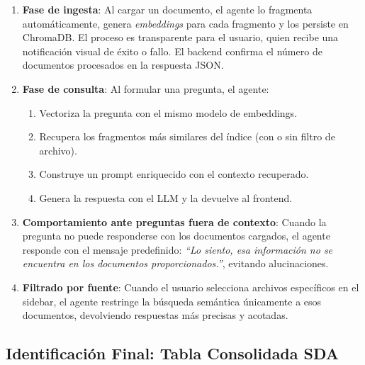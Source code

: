 \documentclass[12pt,a4paper]{article}
\begin{document}
\begin{enumerate}[leftmargin=1.5cm]
  \item \textbf{Fase de ingesta}: Al cargar un documento, el agente lo fragmenta automáticamente, genera \textit{embeddings} para cada fragmento y los persiste en ChromaDB. El proceso es transparente para el usuario, quien recibe una notificación visual de éxito o fallo. El backend confirma el número de documentos procesados en la respuesta JSON.

  \item \textbf{Fase de consulta}: Al formular una pregunta, el agente:
    \begin{enumerate}[label=\alph*.]
      \item Vectoriza la pregunta con el mismo modelo de embeddings.
      \item Recupera los fragmentos más similares del índice (con o sin filtro de archivo).
      \item Construye un prompt enriquecido con el contexto recuperado.
      \item Genera la respuesta con el LLM y la devuelve al frontend.
    \end{enumerate}

  \item \textbf{Comportamiento ante preguntas fuera de contexto}: Cuando la pregunta no puede responderse con los documentos cargados, el agente responde con el mensaje predefinido: \textit{``Lo siento, esa información no se encuentra en los documentos proporcionados.''}, evitando alucinaciones.

  \item \textbf{Filtrado por fuente}: Cuando el usuario selecciona archivos específicos en el sidebar, el agente restringe la búsqueda semántica únicamente a esos documentos, devolviendo respuestas más precisas y acotadas.
\end{enumerate}

\subsection{Identificación Final: Tabla Consolidada SDA}
\end{document}
